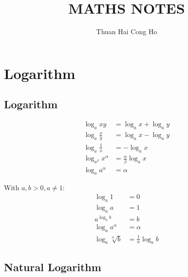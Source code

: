 \documentclass[a4paper, 11pt]{book}
\begin{document}
    \title{MATHS NOTES}
    \author{Thuan Hai Cong Ho}
    \maketitle %
    
    \tableofcontents

    \chapter{Logarithm}
    
        \section{Logarithm}
        
        \begin{multicols}{2}
            \begin{align}
                \log_{a}xy &= \log_{a}x + \log_{a}y\\
                \log_{a}\frac{x}{y} &= \log_{a}x - \log_{a}y\\
                \log_{a}\frac{1}{x} &= -\log_{a}x\\
                \log_{a^{\beta}}x^{\alpha} &= \frac{\alpha}{\beta}\log_{a}x\\
                \log_{a}a^{\alpha} &= \alpha
            \end{align}
            
            \columnbreak

            With $ a, b > 0, a \neq 1 $:
            \begin{align}
                \log_{a}1 &= 0\\
                \log_{a}a &= 1\\
                a^{\log_{a}b} &= b\\
                \log_{a}a^{\alpha} &= \alpha\\
                \log_{a}\sqrt[n]{b} &= \frac{1}{n}\log_{a}b
            \end{align}
        \end{multicols}

        \section{Natural Logarithm}
\end{document}
